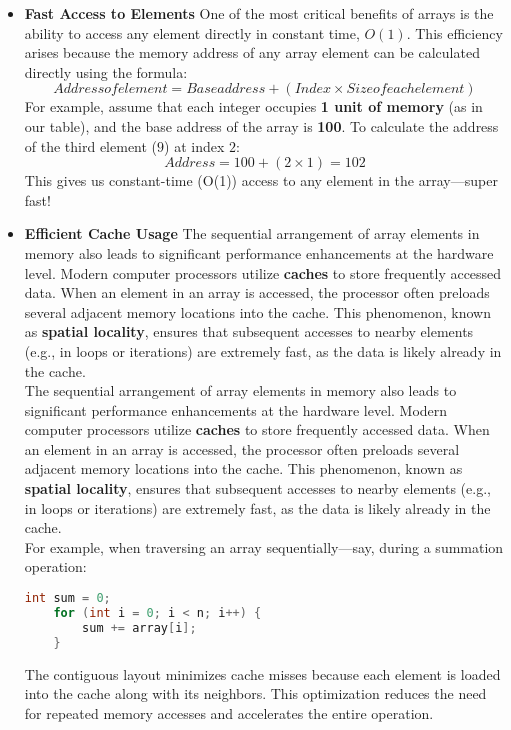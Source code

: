 \documentclass[12pt, oneside]{book}
\begin{document}
\begin{itemize}
	\item \textbf{Fast Access to Elements}
	One of the most critical benefits of arrays is the ability to access any element directly in constant time, \(O(1)\). This efficiency arises because the memory address of any array element can be calculated directly using the formula:  
	\[
	{Address of element} = {Base address} + ({Index} \times {Size of each element})
	\]
	For example, assume that each integer occupies \textbf{1 unit of memory} (as in our table), and the base address of the array is \textbf{100}. To calculate the address of the third element (\(9\)) at index \(2\):
	\[
  	 {Address} = 100 + (2 \times 1) = 102
	\]
	This gives us constant-time (O(1)) access to any element in the array—super fast!
	
	\item \textbf{Efficient Cache Usage}
	The sequential arrangement of array elements in memory also leads to significant performance enhancements at the hardware level. Modern computer processors utilize \textbf{caches} to store frequently accessed data. When an element in an array is accessed, the processor often preloads several adjacent memory locations into the cache. This phenomenon, known as \textbf{spatial locality}, ensures that subsequent accesses to nearby elements (e.g., in loops or iterations) are extremely fast, as the data is likely already in the cache.\\
	The sequential arrangement of array elements in memory also leads to significant performance enhancements at the hardware level. Modern computer processors utilize \textbf{caches} to store frequently accessed data. When an element in an array is accessed, the processor often preloads several adjacent memory locations into the cache. This phenomenon, known as \textbf{spatial locality}, ensures that subsequent accesses to nearby elements (e.g., in loops or iterations) are extremely fast, as the data is likely already in the cache.\\
	
	For example, when traversing an array sequentially—say, during a summation operation:
	\begin{lstlisting}[language=C]
	int sum = 0;
	for (int i = 0; i < n; i++) {
		sum += array[i];
	}
	\end{lstlisting}
	The contiguous layout minimizes cache misses because each element is loaded into the cache along with its neighbors. This optimization reduces the need for repeated memory accesses and accelerates the entire operation.
\end{itemize}
\end{document}

